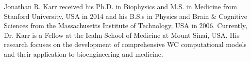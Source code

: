\documentclass[journal,transmag,twoside]{IEEEtran}
\begin{document}
\begin{IEEEbiography}{Jonathan R. Karr}
received his Ph.D. in Biophysics and M.S. in Medicine from Stanford University, USA in 2014 and his B.S.s in Physics and Brain \& Cognitive Sciences from the Massachusetts Institute of Technology, USA in 2006. Currently, Dr. Karr is a Fellow at the Icahn School of Medicine at Mount Sinai, USA. His research focuses on the development of comprehensive WC computational models and their application to bioengineering and medicine.
\end{IEEEbiography}

\vfill
\end{document}
